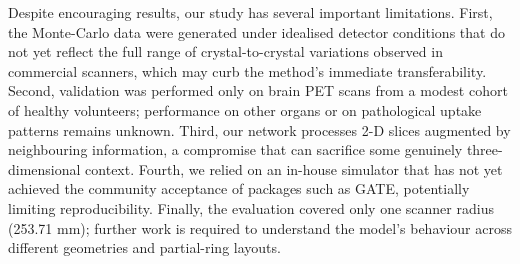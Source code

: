 \documentclass[aps,prb,preprint,groupedaddress,showkeys]{revtex4}
\begin{document}
Despite encouraging results, our study has several important limitations. First, the Monte-Carlo data were generated under idealised detector conditions that do not yet reflect the full range of crystal-to-crystal variations observed in commercial scanners, which may curb the method’s immediate transferability. Second, validation was performed only on brain PET scans from a modest cohort of healthy volunteers; performance on other organs or on pathological uptake patterns remains unknown. Third, our network processes 2-D slices augmented by neighbouring information, a compromise that can sacrifice some genuinely three-dimensional context. Fourth, we relied on an in-house simulator that has not yet achieved the community acceptance of packages such as GATE, potentially limiting reproducibility. Finally, the evaluation covered only one scanner radius (253.71 mm); further work is required to understand the model’s behaviour across different geometries and partial-ring layouts.





\end{document}
